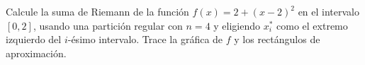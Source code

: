 \item Calcule la suma de Riemann de la función $f(x) = 2 + (x - 2)^2$ en el intervalo $[0, 2]$, usando una partición regular con $n = 4$ y eligiendo $x_i^*$ como el extremo izquierdo del $i$-ésimo intervalo. Trace la gráfica de $f$ y los rectángulos de aproximación.
